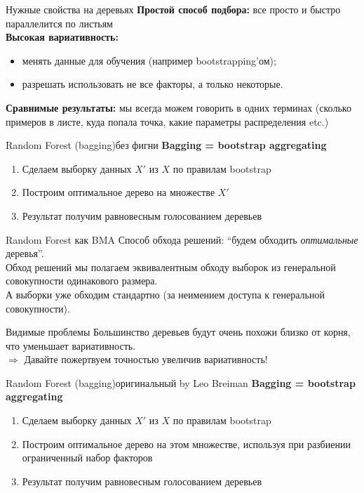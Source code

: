\documentclass[14pt, fleqn, xcolor={dvipsnames, table}]{beamer}
\begin{document}
\begin{frame}{Нужные свойства на деревьях}
\small
\textbf{\color{blue}Простой способ подбора:} все просто и быстро параллелится по листьям \\
\textbf{\color{blue}Высокая вариативность:}
\begin{itemize}
  \item менять данные для обучения (например bootstrapping'ом);
  \item разрешать использовать не все факторы, а только некоторые.
\end{itemize}
\textbf{\color{blue}Сравнимые результаты:} мы всегда можем говорить в одних терминах (сколько примеров в листе, куда попала точка, какие параметры распределения etc.)
\end{frame}

\begin{frame}{Random Forest (bagging)}{без фигни}
\textbf{Bagging = bootstrap aggregating}\\
\begin{enumerate}
  \item Сделаем выборку данных $X'$ из $X$ по правилам bootstrap
  \item Построим оптимальное дерево на множестве $X'$
  \item Результат получим равновесным голосованием деревьев
\end{enumerate}
\end{frame}

\begin{frame}{Random Forest как BMA}
Способ обхода решений: ``будем обходить \textit{оптимальные} деревья''. \\
Обход решений мы полагаем эквивалентным обходу выборок из генеральной совокупности одинакового размера.\\
А выборки уже обходим стандартно (за неимением доступа к генеральной совокупности).
\end{frame}

\begin{frame}{Видимые проблемы}
Большинство деревьев будут очень похожи близко от корня, что уменьшает вариативность. \\
$\Rightarrow$ Давайте пожертвуем точностью увеличив вариативность!
\end{frame}

\begin{frame}{Random Forest (bagging)}{оригинальный by Leo Breiman}
\textbf{Bagging = bootstrap aggregating}\\
\begin{enumerate}
  \item Сделаем выборку данных $X'$ из $X$ по правилам bootstrap
  \item Построим оптимальное дерево на этом множестве, используя при разбиении ограниченный набор факторов
  \item Результат получим равновесным голосованием деревьев
\end{enumerate}
\end{frame}
\end{document}
